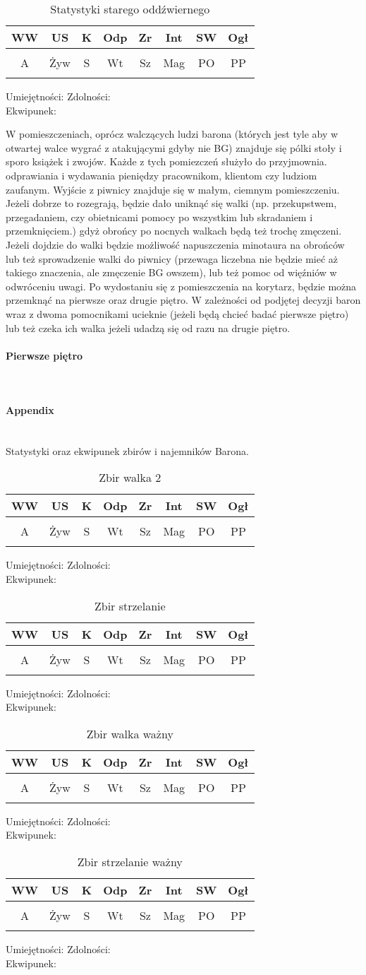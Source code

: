 \documentclass{article}
\newcommand{\whtable}[1]{
    \begin{table}[H]
        \caption{{#1}}
        \vspace{4pt}
        \centering
            \begin{tabular}{|c|c|c|c|c|c|c|c|}
                \hline
                WW & US & K & Odp & Zr & Int & SW & Ogł \\ \hline
                 &  &  &  &  &  &  &  \\ \hline
                A & Żyw & S & Wt & Sz & Mag & PO & PP \\ \hline
                 &  &  &  &  &  &  &  \\ \hline
                \end{tabular}
    \end{table}

    \noindent
    Umiejętności:
    \hspace{150pt}
    Zdolności:
    \vspace{50pt}\\
    Ekwipunek:
    \vspace{50pt}
}
\begin{document}
\whtable{Statystyki starego oddźwiernego}

W pomieszczeniach, oprócz walczących ludzi barona (których jest tyle aby w otwartej walce wygrać z atakującymi gdyby nie BG) znajduje się pólki stoły i sporo książek i zwojów. Każde z tych pomiezczeń służyło do przyjmownia. odprawiania i wydawania pieniędzy pracownikom, klientom czy ludziom zaufanym. Wyjście z piwnicy znajduje się w małym, ciemnym pomieszczeniu. Jeżeli dobrze to rozegrają, będzie dało uniknąć się walki (np. przekupstwem, przegadaniem, czy obietnicami pomocy po wszystkim lub skradaniem i przemknięciem.) gdyż obrońcy po nocnych walkach będą też trochę zmęczeni. Jeżeli dojdzie do walki będzie możliwość napuszczenia minotaura na obrońców lub też sprowadzenie walki do piwnicy (przewaga liczebna nie będzie mieć aż takiego znaczenia, ale zmęczenie BG owszem), lub też pomoc od więźniów w odwróceniu uwagi. Po wydostaniu się z pomieszczenia na korytarz, będzie można przemknąć na pierwsze oraz drugie piętro. W zależności od podjętej decyzji baron wraz z dwoma pomocnikami ucieknie (jeżeli będą chcieć badać pierwsze piętro) lub też czeka ich walka jeżeli udadzą się od razu na drugie piętro. 

\paragraph{\Large{Pierwsze piętro}}\mbox{}\\



\pagebreak
\centering
\paragraph{\Large{Appendix}}\mbox{}\\
Statystyki oraz ekwipunek zbirów i najemników Barona.
\raggedright

\whtable{Zbir walka 2}

\whtable{Zbir strzelanie}

\whtable{Zbir walka ważny}

\whtable{Zbir strzelanie ważny}
\end{document}
